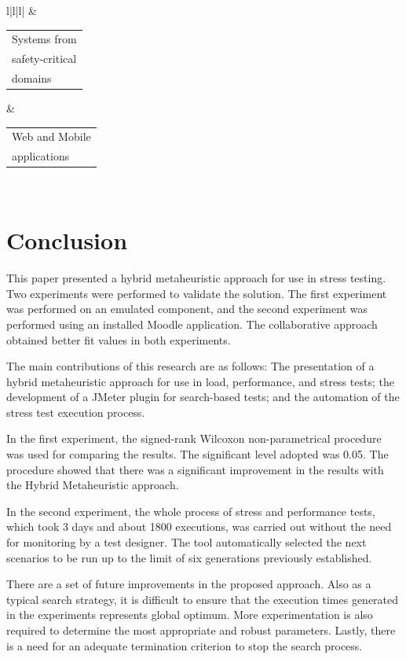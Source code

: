 \documentclass[conference]{IEEEtran}
\begin{document}
\begin{table}[h]
\begin{tabular}{l|l|l|}
 & \begin{tabular}[c]{@{}l@{}}Systems from \\ safety-critical \\ domains\end{tabular}                                         & \begin{tabular}[c]{@{}l@{}}Web and Mobile \\ applications\end{tabular}                                                                 \\ \hline
\end{tabular}
\end{table}



\section{Conclusion}

This paper presented a hybrid metaheuristic approach for use in stress testing. Two experiments were performed to validate the solution. The first experiment was performed on an emulated component, and the second experiment was performed using an installed Moodle application.  The collaborative approach obtained better fit values in both experiments. 

The main contributions of this research are as follows: The presentation of a hybrid metaheuristic approach for use in load, performance, and stress tests; the development of a JMeter plugin  for search-based tests; and  the automation of the stress test execution process.  

In the first experiment, the signed-rank Wilcoxon non-parametrical procedure was used for comparing the results. The significant level adopted was 0.05. The procedure showed that there was a significant improvement in the results with the Hybrid Metaheuristic approach.

In the second experiment, the whole process of stress and performance tests, which took 3 days and about 1800 executions, was carried out without the need for monitoring by a test designer. The tool automatically selected the next scenarios to be run up to the limit of six generations previously established. 

There are a set of future improvements in the proposed approach. Also as a typical search strategy, it is difficult to ensure that the execution times generated in the experiments represents global optimum. More experimentation is also required to determine the
most appropriate and robust parameters. Lastly, there is a need for an adequate termination criterion to stop the search process.
\end{document}
